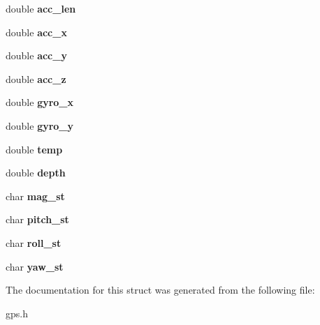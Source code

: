 \begin{DoxyCompactItemize}
\item 
\hypertarget{structattitude__t_a479aa7230c386eee2fc7dfa8862a1658}{double {\bfseries acc\-\_\-len}}\label{structattitude__t_a479aa7230c386eee2fc7dfa8862a1658}

\item 
\hypertarget{structattitude__t_aa529a57650fc42d8ac006bcd9dc55f2d}{double {\bfseries acc\-\_\-x}}\label{structattitude__t_aa529a57650fc42d8ac006bcd9dc55f2d}

\item 
\hypertarget{structattitude__t_a4a3ce30b608b6d90457217f03183589b}{double {\bfseries acc\-\_\-y}}\label{structattitude__t_a4a3ce30b608b6d90457217f03183589b}

\item 
\hypertarget{structattitude__t_aa581f99798c7149221a237864b0983dd}{double {\bfseries acc\-\_\-z}}\label{structattitude__t_aa581f99798c7149221a237864b0983dd}

\item 
\hypertarget{structattitude__t_a01a28cc02e786ba912843137ad56e774}{double {\bfseries gyro\-\_\-x}}\label{structattitude__t_a01a28cc02e786ba912843137ad56e774}

\item 
\hypertarget{structattitude__t_a7e48b5620b82acf7c503e191da7a1469}{double {\bfseries gyro\-\_\-y}}\label{structattitude__t_a7e48b5620b82acf7c503e191da7a1469}

\item 
\hypertarget{structattitude__t_aded456dd3c9cf0f7073c9785c0972d24}{double {\bfseries temp}}\label{structattitude__t_aded456dd3c9cf0f7073c9785c0972d24}

\item 
\hypertarget{structattitude__t_a070b490178ac08f6d6f9e9d1d7bfb790}{double {\bfseries depth}}\label{structattitude__t_a070b490178ac08f6d6f9e9d1d7bfb790}

\item 
\hypertarget{structattitude__t_a470819c1df8ca1c52215440e893ab051}{char {\bfseries mag\-\_\-st}}\label{structattitude__t_a470819c1df8ca1c52215440e893ab051}

\item 
\hypertarget{structattitude__t_ae83edff74965a47505d7d57d6635b1f6}{char {\bfseries pitch\-\_\-st}}\label{structattitude__t_ae83edff74965a47505d7d57d6635b1f6}

\item 
\hypertarget{structattitude__t_a7ed808267e0514753d75bfd491a96e3b}{char {\bfseries roll\-\_\-st}}\label{structattitude__t_a7ed808267e0514753d75bfd491a96e3b}

\item 
\hypertarget{structattitude__t_acfa2198510ab539adf6aff4384c1f28d}{char {\bfseries yaw\-\_\-st}}\label{structattitude__t_acfa2198510ab539adf6aff4384c1f28d}

\end{DoxyCompactItemize}


\-The documentation for this struct was generated from the following file\-:\begin{DoxyCompactItemize}
\item 
gps.\-h\end{DoxyCompactItemize}
